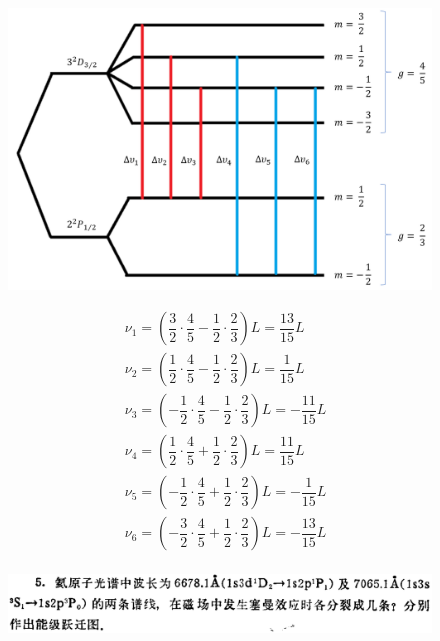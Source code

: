 \documentclass{article}
\begin{document}
\begin{figure}[H]
  \centering
  \includegraphics[width=0.9\linewidth]{figures/Problem31}
  \label{fig:}
\end{figure}

\begin{equation*}
  \begin{aligned}
    & \nu_1 = \left( \dfrac{3}{2} \cdot \dfrac{4}{5} - \dfrac{1}{2} \cdot \dfrac{2}{3} \right) L = \dfrac{13}{15} L \\    
    & \nu_2 = \left( \dfrac{1}{2} \cdot \dfrac{4}{5} - \dfrac{1}{2} \cdot \dfrac{2}{3} \right) L = \dfrac{1}{15} L \\    
    & \nu_3 = \left( - \dfrac{1}{2} \cdot \dfrac{4}{5} - \dfrac{1}{2} \cdot \dfrac{2}{3} \right) L = - \dfrac{11}{15} L \\    
    & \nu_4 = \left( \dfrac{1}{2} \cdot \dfrac{4}{5} + \dfrac{1}{2} \cdot \dfrac{2}{3} \right) L = \dfrac{11}{15} L \\    
    & \nu_5 = \left( - \dfrac{1}{2} \cdot \dfrac{4}{5} + \dfrac{1}{2} \cdot \dfrac{2}{3} \right) L = - \dfrac{1}{15} L \\    
    & \nu_6 = \left( - \dfrac{3}{2} \cdot \dfrac{4}{5} + \dfrac{1}{2} \cdot \dfrac{2}{3} \right) L = - \dfrac{13}{15} L \\    
  \end{aligned}
\end{equation*}

\begin{figure}[H]
  \centering
  \includegraphics[width=\linewidth]{figures/Problem5}
  \label{fig:}
\end{figure}
\end{document}
